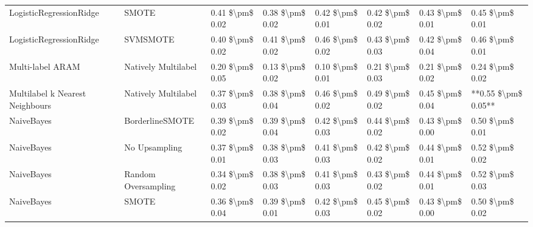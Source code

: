 \begin{tabular}{llllllll}
        LogisticRegressionRidge &                         SMOTE & 0.41 \$\textbackslash pm\$ 0.02 &           0.38 \$\textbackslash pm\$ 0.02 &       0.42 \$\textbackslash pm\$ 0.01 &        0.42 \$\textbackslash pm\$ 0.02 &                         0.43 \$\textbackslash pm\$ 0.01 &     0.45 \$\textbackslash pm\$ 0.01 \\
        LogisticRegressionRidge &                      SVMSMOTE & 0.40 \$\textbackslash pm\$ 0.02 &           0.41 \$\textbackslash pm\$ 0.02 &       0.46 \$\textbackslash pm\$ 0.02 &        0.43 \$\textbackslash pm\$ 0.03 &                         0.42 \$\textbackslash pm\$ 0.04 &     0.46 \$\textbackslash pm\$ 0.01 \\
               Multi-label ARAM &           Natively Multilabel & 0.20 \$\textbackslash pm\$ 0.05 &           0.13 \$\textbackslash pm\$ 0.02 &       0.10 \$\textbackslash pm\$ 0.01 &        0.21 \$\textbackslash pm\$ 0.03 &                         0.21 \$\textbackslash pm\$ 0.02 &     0.24 \$\textbackslash pm\$ 0.02 \\
Multilabel k Nearest Neighbours &           Natively Multilabel & 0.37 \$\textbackslash pm\$ 0.03 &           0.38 \$\textbackslash pm\$ 0.04 &       0.46 \$\textbackslash pm\$ 0.02 &        0.49 \$\textbackslash pm\$ 0.02 &                         0.45 \$\textbackslash pm\$ 0.04 & **0.55 \$\textbackslash pm\$ 0.05** \\
                     NaiveBayes &               BorderlineSMOTE & 0.39 \$\textbackslash pm\$ 0.02 &           0.39 \$\textbackslash pm\$ 0.04 &       0.42 \$\textbackslash pm\$ 0.03 &        0.44 \$\textbackslash pm\$ 0.02 &                         0.43 \$\textbackslash pm\$ 0.00 &     0.50 \$\textbackslash pm\$ 0.01 \\
                     NaiveBayes &                 No Upsampling & 0.37 \$\textbackslash pm\$ 0.01 &           0.38 \$\textbackslash pm\$ 0.03 &       0.41 \$\textbackslash pm\$ 0.03 &        0.42 \$\textbackslash pm\$ 0.02 &                         0.44 \$\textbackslash pm\$ 0.01 &     0.52 \$\textbackslash pm\$ 0.02 \\
                     NaiveBayes &           Random Oversampling & 0.34 \$\textbackslash pm\$ 0.02 &           0.38 \$\textbackslash pm\$ 0.03 &       0.41 \$\textbackslash pm\$ 0.03 &        0.43 \$\textbackslash pm\$ 0.02 &                         0.44 \$\textbackslash pm\$ 0.01 &     0.52 \$\textbackslash pm\$ 0.03 \\
                     NaiveBayes &                         SMOTE & 0.36 \$\textbackslash pm\$ 0.04 &           0.39 \$\textbackslash pm\$ 0.01 &       0.42 \$\textbackslash pm\$ 0.03 &        0.45 \$\textbackslash pm\$ 0.02 &                         0.43 \$\textbackslash pm\$ 0.00 &     0.50 \$\textbackslash pm\$ 0.02 \\

\end{tabular}
